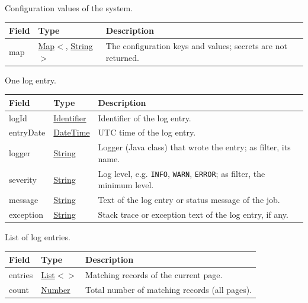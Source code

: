 \documentclass[a4paper]{arrowhead}
\newcommand{\mref}[2][]{{\textcolor{ArrowheadPurple}{\hyperref[sec:model:#2]{\ifstrempty{#1}{#2}{#1}}}}}
\newcommand{\pref}[1]{{\textcolor{ArrowheadGrey}{\hyperref[sec:model:primitives:#1]{#1}}}}
\begin{document}

Configuration values of the system.


\noindent\begin{tabularx}{\textwidth}{| >{\raggedright\arraybackslash}p{3.9cm} | >{\raggedright\arraybackslash\small}p{5.3cm} | X |} \hline
\rowcolor{gray!33} Field & Type & Description \\ \hline
map & \pref{Map}$<$\allowbreak{}\pref{String}, \pref{String}$>$ & The configuration keys and values; secrets are not returned. \\ \hline
\end{tabularx}




One log entry.


\noindent\begin{tabularx}{\textwidth}{| >{\raggedright\arraybackslash}p{3.9cm} | >{\raggedright\arraybackslash\small}p{5.3cm} | X |} \hline
\rowcolor{gray!33} Field & Type & Description \\ \hline
log\allowbreak{}Id & \pref{Identifier} & Identifier of the log entry. \\ \hline
entry\allowbreak{}Date & \pref{DateTime} & UTC time of the log entry. \\ \hline
logger & \pref{String} & Logger (Java class) that wrote the entry; as filter, its name. \\ \hline
severity & \pref{String} & Log level, e.g. \texttt{INFO}, \texttt{WARN}, \texttt{ERROR}; as filter, the minimum level. \\ \hline
message & \pref{String} & Text of the log entry or status message of the job. \\ \hline
exception & \pref{String} & Stack trace or exception text of the log entry, if any. \\ \hline
\end{tabularx}




List of log entries.


\noindent\begin{tabularx}{\textwidth}{| >{\raggedright\arraybackslash}p{3.9cm} | >{\raggedright\arraybackslash\small}p{5.3cm} | X |} \hline
\rowcolor{gray!33} Field & Type & Description \\ \hline
entries & \pref{List}$<$\allowbreak{}\mref{LogEntry}$>$ & Matching records of the current page. \\ \hline
count & \pref{Number} & Total number of matching records (all pages). \\ \hline
\end{tabularx}
\end{document}
